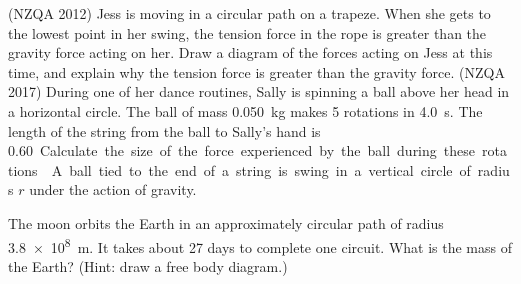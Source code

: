 \documentclass[a4paper]{exam}
\begin{document}
\begin{questions}
    \question (NZQA 2012) Jess is moving in a circular path on a trapeze. When she gets to the lowest point in her
              swing, the tension force in the rope is greater than the gravity force acting on her. Draw a diagram of the
              forces acting on Jess at this time, and explain why the tension force is greater than the gravity force.
    \question (NZQA 2017) During one of her dance routines, Sally is spinning a ball above her head in a horizontal circle.
              The ball of mass \SI{0.050}{\kilo\gram} makes 5 rotations in \SI{4.0}{\second}. The length of the string
              from the ball to Sally’s hand is \SI{0.60}.
              Calculate the size of the force experienced by the ball during these rotations.
    \question A ball tied to the end of a string is swing in a vertical circle of radius $ r $ under the action of gravity.
    \question The moon orbits the Earth in an approximately circular path of radius \SI{3.8e8}{\metre}. It takes
              about 27 days to complete one circuit. What is the mass of the Earth? (Hint: draw a free body diagram.)
  \end{questions}
\end{document}
